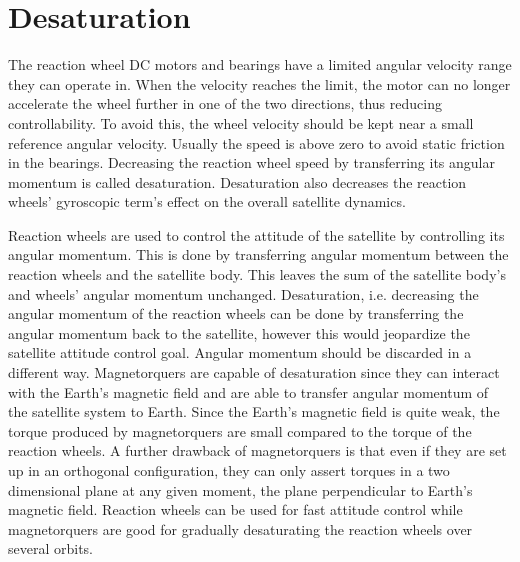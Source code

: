 \section{Desaturation}

The reaction wheel DC motors and bearings have a limited angular velocity range they can operate in. When the velocity reaches the limit, the motor can no longer accelerate the wheel further in one of the two directions, thus reducing controllability. To avoid this, the wheel velocity should be kept near a small reference angular velocity. Usually the speed is above zero to avoid static friction in the bearings. Decreasing the reaction wheel speed by transferring its angular momentum is called desaturation. Desaturation also decreases the reaction wheels' gyroscopic term's effect on the overall satellite dynamics.

Reaction wheels are used to control the attitude of the satellite by controlling its angular momentum. This is done by transferring angular momentum between the reaction wheels and the satellite body. This leaves the sum of the satellite body's and wheels' angular momentum unchanged. Desaturation, i.e. decreasing the angular momentum of the reaction wheels can be done by transferring the angular momentum back to the satellite, however this would jeopardize the satellite attitude control goal.  Angular momentum should be discarded in a different way. Magnetorquers are capable of desaturation since they can interact with the Earth's magnetic field and are able to transfer angular momentum of the satellite system to Earth. Since the Earth's magnetic field is quite weak, the torque produced by magnetorquers are small compared to the torque of the reaction wheels. A further drawback of magnetorquers is that even if they are set up in an orthogonal configuration, they can only assert torques in a two dimensional plane at any given moment, the plane perpendicular to Earth's magnetic field. Reaction wheels can be used for fast attitude control while magnetorquers are good for gradually desaturating the reaction wheels over several orbits.

